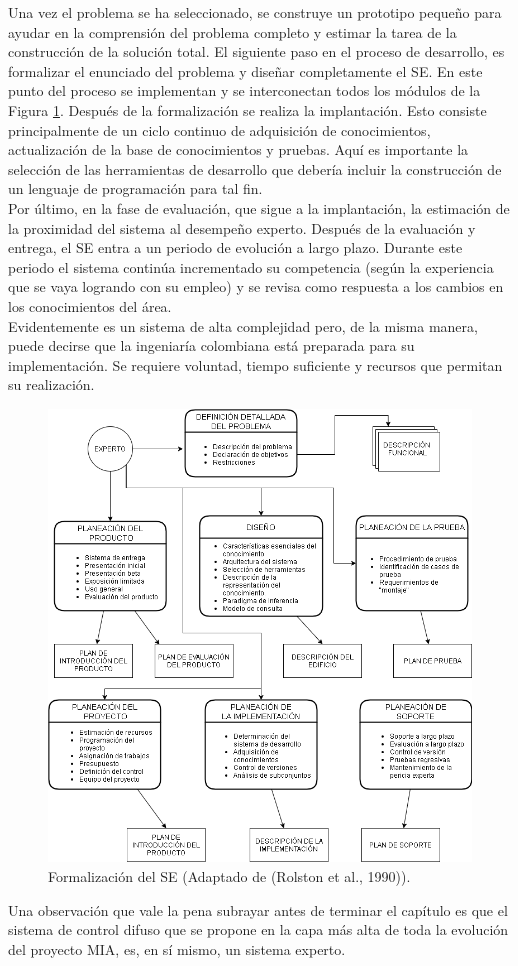 Una vez el problema se ha seleccionado, se construye un prototipo pequeño para ayudar en la comprensión del problema completo y estimar la tarea de la construcción de la solución total. El siguiente paso en el proceso de desarrollo, es formalizar el enunciado del problema y diseñar completamente el SE.  En este punto del proceso se implementan y se interconectan todos los módulos de la Figura \ref{fig:10-7}.  Después de la formalización se realiza la implantación. Esto consiste principalmente de un ciclo continuo de adquisición de conocimientos, actualización de la base de conocimientos y pruebas.  Aquí es importante la selección de las herramientas de desarrollo que debería incluir la construcción de un lenguaje de programación para tal fin.\\
Por último, en la fase de evaluación, que sigue a la implantación, la estimación de la proximidad del sistema al desempeño experto. Después de la evaluación y entrega, el SE entra a un periodo de evolución a largo plazo. Durante este periodo el sistema continúa incrementado su competencia (según la experiencia que se vaya logrando con su empleo) y se revisa como respuesta a los cambios en los conocimientos del área. \\
Evidentemente es un sistema de alta complejidad pero, de la misma manera, puede decirse que la ingeniaría colombiana está preparada para su implementación.  Se requiere voluntad, tiempo suficiente y  recursos que permitan su realización.\\
\begin{figure}[H]
\centering
\captionsetup{justification=centering,margin=2cm}
\includegraphics[scale=0.4]{chapters/chapter10/figures/1-7}
\caption{Formalización del SE (Adaptado de (Rolston et al., 1990)).}
\label{fig:10-7}
\end{figure}
Una observación que vale la pena subrayar antes de terminar el capítulo es que el sistema de control difuso que se propone en la capa más alta de toda la evolución del proyecto MIA, es, en sí mismo, un sistema experto.\\

